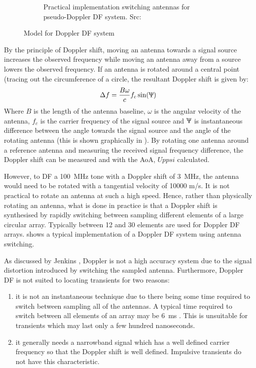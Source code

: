 \begin{figure}
\begin{subfigure}[b]{0.48\textwidth}
    \caption{Practical implementation switching antennas for pseudo-Doppler DF system. Src: \cite{jenkins1991smallaperture}}
  \end{subfigure}
  \caption{Model for Doppler DF system}
  \label{fig:lit-review-doppler-switching}
\end{figure}

By the principle of Doppler shift, moving an antenna towards a signal source increases the observed frequency while moving an antenna away from a source lowers the observed frequency. 
If an antenna is rotated around a central point (tracing out the circumference of a circle, the resultant Doppler shift is given by: \cite{poisel2012electronic}
\begin{equation} \label{eq:lit-review:doppler}
  \Delta f = \frac{B\omega}{c}f_c\sin(\Uppsi)
\end{equation}
Where \(B\) is the length of the antenna baseline, \(\omega\) is the angular velocity of the antenna, \(f_c\) is the carrier frequency of the signal source and \(\Uppsi\) is instantaneous difference between the angle towards the signal source and the angle of the rotating antenna (this is shown graphically in ). By rotating one antenna around a reference antenna and measuring the received signal frequency difference, the Doppler shift can be measured and with  the AoA, \(Uppsi\)  calculated.

However, to DF a \SI{100}{\mega\hertz} tone with a Doppler shift of \SI{3}{\mega\hertz}, the antenna would need to be rotated with a tangential velocity of 10000 m/s\cite{jenkins1991smallaperture}. 
It is not practical to rotate an antenna at such a high speed. 
Hence, rather than physically rotating an antenna, what is done in practice is that a Doppler shift is synthesised by rapidly switching between sampling different elements of a large circular array. 
Typically between 12 and 30 elements are used for Doppler DF arrays. 
 shows a typical implementation of a Doppler DF system using antenna switching.

As discussed by Jenkins \cite{jenkins1991smallaperture}, Doppler is not a high accuracy system due to the signal distortion introduced by switching the sampled antenna. Furthermore, Doppler DF is not suited to locating transients for two reasons:
\begin{enumerate}
  \item it is not an instantaneous technique due to there being some time required to switch between sampling all of the antennas. A typical time required to switch between all elements of an array may be \SI{6}{\milli\second} \cite{rhode2000introtodf}. This is unsuitable for transients which may last only a few hundred nanoseconds.
  \item it generally needs a narrowband signal which has a well defined carrier frequency so that the Doppler shift is well defined. Impulsive transients do not have this characteristic.
\end{enumerate}


